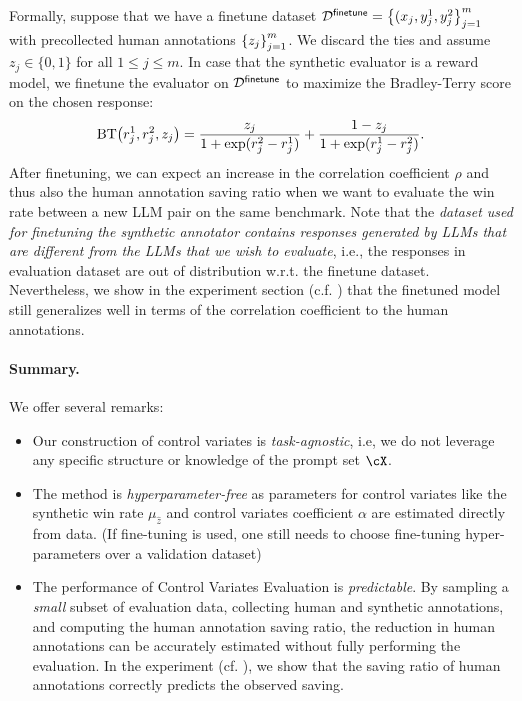 Formally, suppose that we have a finetune dataset $\mathcal{D}^{\mathsf{finetune}} = \left\{(x_j,y_j^1, y_j^2\right\}_{j=1}^m$ with precollected human annotations $\left\{z_j\right\}_{j=1}^m$. We discard the ties and assume $z_j\in \{0,1\}$ for all $1\leq j\leq m$. 
In case that the synthetic evaluator is a reward model, we finetune the evaluator on $\mathcal{D}^{\mathsf{finetune}}$ to maximize the Bradley-Terry score \citep{bradley1952rank} on the chosen response: 
\begin{align*}
    \mathrm{BT}\prn*{r_j^1, r_j^2,z_j} = \frac{z_j}{1+\exp(r_j^2-r_j^1)} + \frac{1-z_j }{1+\exp(r_j^1-r_j^2)}.
\end{align*}
After finetuning, we can expect an increase in the correlation coefficient $\rho$ and thus also the human annotation saving ratio when we want to evaluate the win rate between a new LLM pair on the same benchmark. Note that the \emph{dataset used for finetuning the synthetic annotator contains responses generated by LLMs that are different from the LLMs that we wish to evaluate}, i.e., the responses in evaluation dataset are out of distribution w.r.t. the finetune dataset. Nevertheless, we show in the experiment section (c.f. ) that the finetuned model still generalizes well in terms of the correlation coefficient to the human annotations.

\paragraph{Summary.}
We offer several remarks:
\begin{itemize}
\item Our construction of control variates is \emph{task-agnostic}, i.e, we do not leverage any specific structure or knowledge of the prompt set $\cX$. 
\item The method is \emph{hyperparameter-free} as parameters for control variates like the synthetic win rate $\mu_{\hat z}$ and control variates coefficient $\alpha$ are estimated directly from data. (If fine-tuning is used, one still needs to choose fine-tuning hyper-parameters over a validation dataset) 
\item The performance of Control Variates Evaluation is \emph{predictable}. By sampling a \emph{small} subset of evaluation data, collecting human and synthetic annotations, and computing the human annotation saving ratio, the reduction in human annotations can be accurately estimated without fully performing the evaluation.
In the experiment (cf. ), we show that the saving ratio of human annotations correctly predicts the observed saving.
\end{itemize}